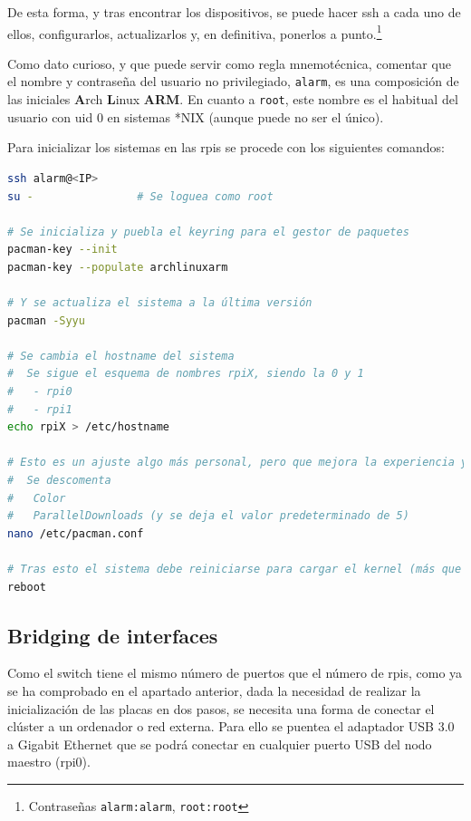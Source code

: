 De esta forma, y tras encontrar los dispositivos, se puede hacer \acrshort{ssh} a cada uno de ellos, configurarlos, actualizarlos y, en definitiva, ponerlos a punto.\footnote{Contraseñas \texttt{alarm:alarm}, \texttt{root:root}}

Como dato curioso, y que puede servir como regla mnemotécnica, comentar que el nombre y contraseña del usuario no privilegiado, \texttt{alarm}, es una composición de las iniciales \textbf{A}rch \textbf{L}inux \textbf{ARM}. En cuanto a \texttt{root}, este nombre es el habitual del usuario con \acrshort{uid} 0 en sistemas *NIX (aunque puede no ser el único).

Para inicializar los sistemas en las \acrshort{rpi}s se procede con los siguientes comandos:

\begin{lstlisting}[language=bash]
ssh alarm@<IP>
su -                # Se loguea como root

# Se inicializa y puebla el keyring para el gestor de paquetes
pacman-key --init
pacman-key --populate archlinuxarm

# Y se actualiza el sistema a la última versión
pacman -Syyu

# Se cambia el hostname del sistema
#  Se sigue el esquema de nombres rpiX, siendo la 0 y 1
#   - rpi0
#   - rpi1
echo rpiX > /etc/hostname

# Esto es un ajuste algo más personal, pero que mejora la experiencia y velocidad en las actualizaciones: se edita el archivo /etc/pacman.conf
#  Se descomenta
#   Color
#   ParallelDownloads (y se deja el valor predeterminado de 5)
nano /etc/pacman.conf

# Tras esto el sistema debe reiniciarse para cargar el kernel (más que probablemente) actualizado. Tras el arranque se debe verificar que todo funcione correctamente.
reboot
\end{lstlisting}

\subsection{Bridging de interfaces}
Como el switch tiene el mismo número de puertos que el número de \acrshort{rpi}s, como ya se ha comprobado en el apartado anterior, dada la necesidad de realizar la inicialización de las placas en dos pasos, se necesita una forma de conectar el clúster a un ordenador o red externa. Para ello se puentea el adaptador USB 3.0 a Gigabit Ethernet que se podrá conectar en cualquier puerto USB del nodo maestro (rpi0).

